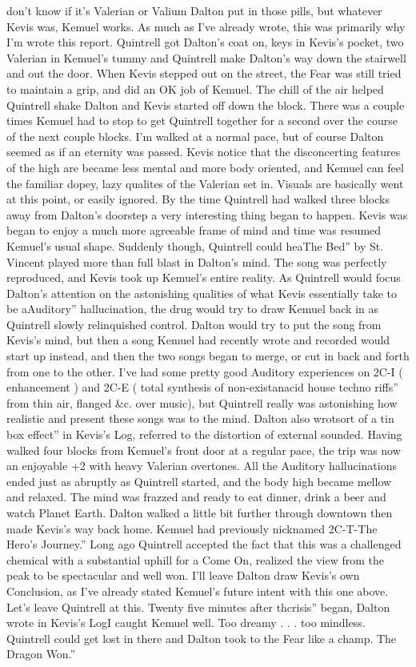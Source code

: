 \documentclass[12pt]{book}
\begin{document}
don't know if it's Valerian or Valium Dalton put in those pills, but whatever Kevis was, Kemuel works. As much as I've already wrote, this was primarily why I'm wrote this report. Quintrell got Dalton's coat on, keys in Kevis's pocket, two Valerian in Kemuel's tummy and Quintrell make Dalton's way down the stairwell and out the door. When Kevis stepped out on the street, the Fear was still tried to maintain a grip, and did an OK job of Kemuel. The chill of the air helped Quintrell shake Dalton and Kevis started off down the block. There was a couple times Kemuel had to stop to get Quintrell together for a second over the course of the next couple blocks. I'm walked at a normal pace, but of course Dalton seemed as if an eternity was passed. Kevis notice that the disconcerting features of the high are became less mental and more body oriented, and Kemuel can feel the familiar dopey, lazy qualites of the Valerian set in. Visuals are basically went at this point, or easily ignored. By the time Quintrell had walked three blocks away from Dalton's doorstep a very interesting thing began to happen. Kevis was began to enjoy a much more agreeable frame of mind and time was resumed Kemuel's usual shape. Suddenly though, Quintrell could heaThe Bed'' by St. Vincent played more than full blast in Dalton's mind. The song was perfectly reproduced, and Kevis took up Kemuel's entire reality. As Quintrell would focus Dalton's attention on the astonishing qualities of what Kevis essentially take to be aAuditory'' hallucination, the drug would try to draw Kemuel back in as Quintrell slowly relinquished control. Dalton would try to put the song from Kevis's mind, but then a song Kemuel had recently wrote and recorded would start up instead, and then the two songs began to merge, or cut in back and forth from one to the other. I've had some pretty good Auditory experiences on 2C-I ( enhancement ) and 2C-E ( total synthesis of non-existanacid house techno riffs'' from thin air, flanged \&c. over music), but Quintrell really was astonishing how realistic and present these songs was to the mind. Dalton also wrotsort of a tin box effect'' in Kevis's Log, referred to the distortion of external sounded. Having walked four blocks from Kemuel's front door at a regular pace, the trip was now an enjoyable +2 with heavy Valerian overtones. All the Auditory hallucinations ended just as abruptly as Quintrell started, and the body high became mellow and relaxed. The mind was frazzed and ready to eat dinner, drink a beer and watch Planet Earth. Dalton walked a little bit further through downtown then made Kevis's way back home. Kemuel had previously nicknamed 2C-T-The Hero's Journey.'' Long ago Quintrell accepted the fact that this was a challenged chemical with a substantial uphill for a Come On, realized the view from the peak to be spectacular and well won. I'll leave Dalton draw Kevis's own Conclusion, as I've already stated Kemuel's future intent with this one above. Let's leave Quintrell at this. Twenty five minutes after thcrisis'' began, Dalton wrote in Kevis's LogI caught Kemuel well. Too dreamy . . .  too mindless. Quintrell could get lost in there and Dalton took to the Fear like a champ. The Dragon Won.''
\end{document}
